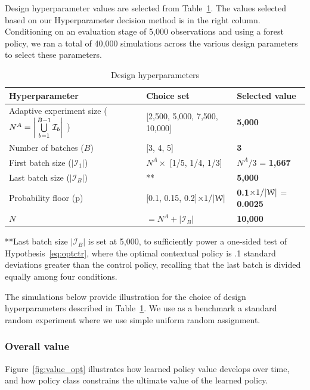 \documentclass[letterpaper, 12pt, parskip=full,DIV=10]{scrartcl}
\begin{document}
Design hyperparameter values are selected from Table~\ref{tab:design}. The values selected based on our Hyperparameter decision method is in the right column. Conditioning on an evaluation stage of 5,000 observations and using a forest policy, we ran a total of 40,000 simulations across the various design parameters to select these parameters. 

\begin{table}[H]
\centering
\begin{adjustbox}{max width = \textwidth}
\begin{tabular}{l | l | l}
\textbf{Hyperparameter} & \textbf{Choice set} & \textbf{Selected value}\\ \hline
Adaptive experiment size ($N^A = \bigg{\lvert} \bigcup\limits_{b=1}^{B-1} \mathcal{I}_{b} \bigg{\rvert}$ )& [2,500, 5,000, 7,500, 10,000] & \textbf{{5,000}} \\
Number of batches ($B$)& [3, 4, 5] & \textbf{{3}} \\
First batch size ($|\mathcal{I}_1|$) & $N^A \times$ [1/5, 1/4, 1/3] & $N^A/3$ = \textbf{1,667} \\
Last batch size ($|\mathcal{I}_B|$) & ** & \textbf{5,000} \\
Probability floor (p)& [0.1, 0.15, 0.2]$\times 1/ |{\EuScript W}|$ & \textbf{{0.1}}$\times 1/ |{\EuScript W}|$ = \textbf{0.0025} \\
$N$ & $=N^A + |\mathcal{I}_B| $& \textbf{{10,000}} \\
\end{tabular}
\end{adjustbox}
\caption{Design hyperparameters} 
\label{tab:design}
\end{table}
**Last batch size $|\mathcal{I}_B|$ is set at 5,000, to sufficiently power a one-sided test of Hypothesis~\ref{eq:optctr}, where the optimal contextual policy is .1 standard deviations greater than the control policy, recalling that the last batch is divided equally among four conditions. 

\FloatBarrier

The simulations below provide illustration for the choice of design hyperparameters described in Table~\ref{tab:design}. We use as a benchmark a standard random experiment where we use simple uniform random assignment. 

\subsubsection{Overall value}


Figure~\ref{fig:value_opt} illustrates how learned policy value develops over time, and how policy class constrains the ultimate value of the learned policy. 
\end{document}
